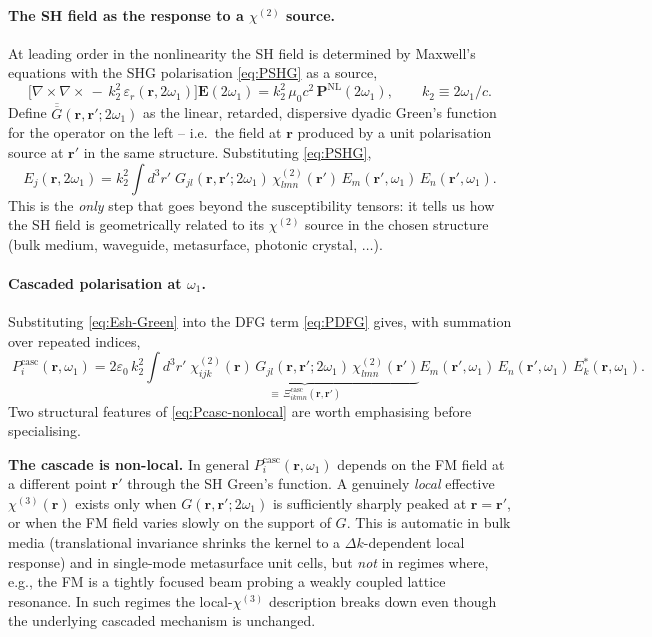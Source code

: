 \documentclass[11pt,a4paper]{article}
\newcommand{\eps}{\varepsilon}
\newcommand{\bvec}[1]{\mathbf{#1}}
\newcommand{\ri}{\bvec{r}}
\newcommand{\chitwo}{\chi^{(2)}}
\newcommand{\chithree}{\chi^{(3)}}
\begin{document}
\paragraph{The SH field as the response to a $\chitwo$ source.}
At leading order in the nonlinearity the SH field is determined by
Maxwell's equations with the SHG polarisation \eqref{eq:PSHG} as a
source,
\begin{equation}
  \bigl[\nabla\!\times\!\nabla\!\times\,-\,k_2^2\,\eps_r(\ri,2\omega_1)\bigr]
  \mathbf E(2\omega_1)=k_2^2\,\mu_0 c^2\,\mathbf P^{\text{NL}}(2\omega_1),
  \qquad k_2\equiv 2\omega_1/c.
\label{eq:waveeq-SH}
\end{equation}
Define $\overline{\overline G}(\ri,\ri';2\omega_1)$ as the linear,
retarded, dispersive dyadic Green's function for the operator on the
left -- i.e.\ the field at $\ri$ produced by a unit polarisation source
at $\ri'$ in the same structure.  Substituting \eqref{eq:PSHG},
\begin{equation}
  \boxed{\;
    E_j(\ri,2\omega_1)
    = k_2^2\!\int\!d^3r'\;
      G_{jl}(\ri,\ri';2\omega_1)\,\chitwo_{lmn}(\ri')\,
      E_m(\ri',\omega_1)\,E_n(\ri',\omega_1).
  \;}
  \label{eq:Esh-Green}
\end{equation}
This is the \emph{only} step that goes beyond the susceptibility
tensors: it tells us how the SH field is geometrically related to its
$\chitwo$ source in the chosen structure (bulk medium, waveguide,
metasurface, photonic crystal, $\ldots$).

\paragraph{Cascaded polarisation at $\omega_1$.}
Substituting \eqref{eq:Esh-Green} into the DFG term \eqref{eq:PDFG}
gives, with summation over repeated indices,
\begin{equation}
  \boxed{\;
  P_i^{\text{casc}}(\ri,\omega_1)
  = 2\eps_0\,k_2^2\!\int\!d^3r'\;
    \underbrace{\chitwo_{ijk}(\ri)\,
                G_{jl}(\ri,\ri';2\omega_1)\,
                \chitwo_{lmn}(\ri')}_{\equiv\,\Xi^{\text{casc}}_{ikmn}(\ri,\ri')}
    E_m(\ri',\omega_1)\,E_n(\ri',\omega_1)\,E_k^*(\ri,\omega_1).
  \;}\label{eq:Pcasc-nonlocal}
\end{equation}
Two structural features of \eqref{eq:Pcasc-nonlocal} are worth
emphasising before specialising.

\textbf{The cascade is non-local.}  In general
$P_i^{\text{casc}}(\ri,\omega_1)$ depends on the FM field at a different
point $\ri'$ through the SH Green's function.  A genuinely \emph{local}
effective $\chithree(\ri)$ exists only when $G(\ri,\ri';2\omega_1)$ is
sufficiently sharply peaked at $\ri=\ri'$, or when the FM field varies
slowly on the support of $G$.  This is automatic in bulk media
(translational invariance shrinks the kernel to a
$\Delta k$-dependent local response) and in single-mode metasurface
unit cells, but \emph{not} in regimes where, e.g., the FM is a tightly
focused beam probing a weakly coupled lattice resonance.  In such
regimes the local-$\chithree$ description breaks down even though the
underlying cascaded mechanism is unchanged.
\end{document}
